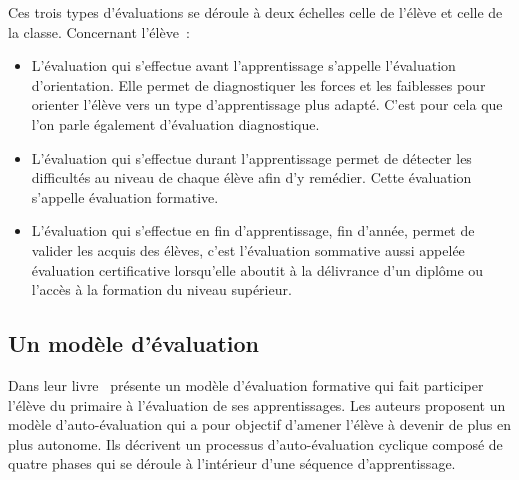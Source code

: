 Ces trois types d'évaluations se déroule à deux échelles celle de l'élève et celle de la classe.
Concernant l'élève~:
\begin{itemize}
\item L'évaluation qui s'effectue avant l'apprentissage s'appelle l'évaluation d'orientation. Elle permet de diagnostiquer les forces et les faiblesses pour orienter l'élève vers un type d'apprentissage plus adapté. C'est pour cela que l'on parle également d'évaluation diagnostique.
\item L'évaluation qui s'effectue durant l'apprentissage permet de détecter les difficultés au niveau de chaque élève afin d'y remédier. Cette évaluation s'appelle évaluation formative.
\item L'évaluation qui s'effectue en fin d'apprentissage, fin d'année, permet de valider les acquis des élèves, c'est l'évaluation sommative aussi appelée évaluation certificative lorsqu'elle aboutit à la délivrance d'un diplôme ou l'accès à la formation du niveau supérieur.
\end{itemize}

\subsection{Un modèle d'évaluation}

Dans leur livre~\cite{doyon_faire_1991} présente un modèle d'évaluation formative qui fait participer l'élève du primaire à l'évaluation de ses apprentissages. 
Les auteurs proposent un modèle d'auto-évaluation qui a pour objectif d'amener l'élève à devenir de plus en plus autonome.
Ils décrivent un processus d'auto-évaluation cyclique composé de quatre phases qui se déroule à l'intérieur d'une séquence d'apprentissage.

